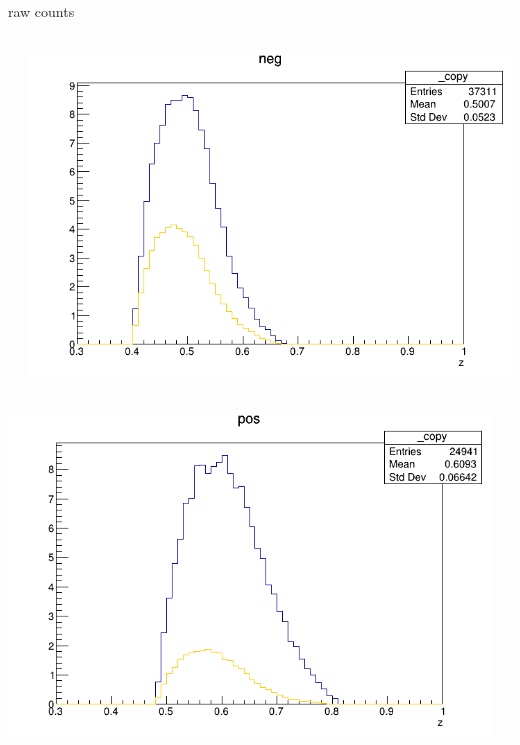 \begin{frame}{raw counts}
\begin{columns}
\begin{column}[T]{0.25\textwidth}
\end{column}
\begin{column}[T]{0.25\textwidth}
\includegraphics[width = \textwidth]{results/yield/statistics/yield_x_Q2_z_0.60_4.775_0.50_neg.png}
\end{column}
\end{columns}
\begin{columns}
\begin{column}[T]{0.25\textwidth}
\includegraphics[width = \textwidth]{results/yield/statistics/yield_x_Q2_z_0.60_4.775_0.60_pos.png}
\end{column}
\begin{column}[T]{0.25\textwidth}

\end{column}
\end{columns}
\end{frame}

